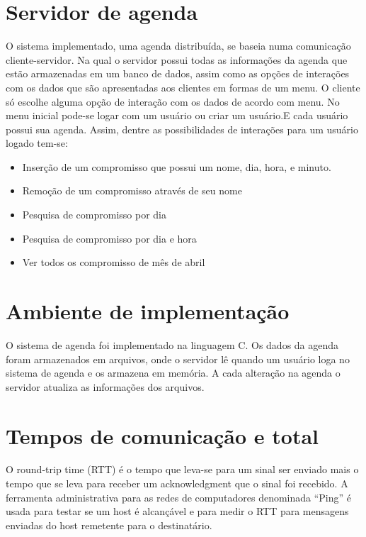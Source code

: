 \documentclass[10pt,a4paper]{article}
\begin{document}
\section{Servidor de agenda}
  O sistema implementado, uma agenda distribuída, se baseia numa comunicação
  cliente-servidor. Na qual o servidor possui todas as informações da
  agenda que estão armazenadas em um banco de dados,
  assim como as opções de interações com os dados que são apresentadas
  aos clientes em formas de um menu.
  O cliente só escolhe alguma opção de interação com os dados de
  acordo com menu.
  No menu inicial pode-se logar com um usuário ou criar um usuário.E cada
  usuário possui sua agenda. Assim, dentre as possibilidades de interações para um usuário logado tem-se:
  \begin{itemize}
  \item Inserção de um compromisso que possui um nome, dia, hora, e minuto. 
  \item Remoção de um compromisso através de seu nome
  \item Pesquisa de compromisso por dia
  \item Pesquisa de compromisso por dia e hora
  \item Ver todos os compromisso de mês de abril
  \end{itemize}
  
\section{Ambiente de implementação}
  O sistema de agenda foi implementado na linguagem C. Os dados da agenda foram armazenados em arquivos, onde o servidor lê quando um usuário loga no sistema de agenda e os armazena em memória. A cada alteração na agenda o servidor atualiza as informações dos arquivos.

\section{Tempos de comunicação e total}
O round-trip time (RTT) é o tempo que leva-se para um sinal ser
enviado mais o tempo que se leva para receber um acknowledgment que o
sinal foi recebido. A ferramenta administrativa para as redes de
computadores denominada ``Ping'' é usada para testar se um host é alcançável e para
medir o RTT para mensagens enviadas do host remetente para o
destinatário.
\end{document}
